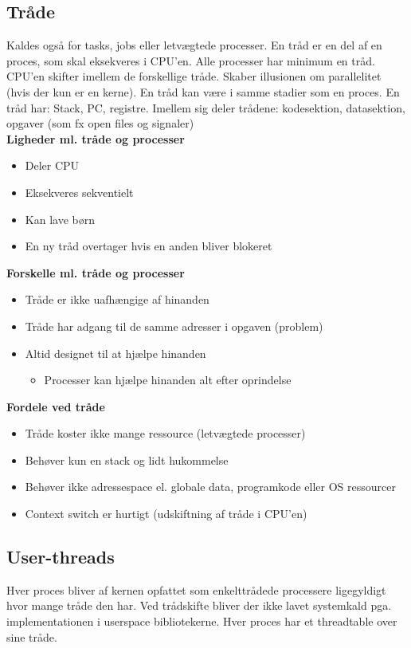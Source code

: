 \subsection{Tråde}
Kaldes også for tasks, jobs eller letvægtede processer. En tråd er en del af en proces, som skal eksekveres i CPU’en. Alle processer har minimum en tråd. CPU’en skifter imellem de forskellige tråde. Skaber illusionen om parallelitet (hvis der kun er en kerne).  En tråd kan være i samme stadier som en proces. En tråd har:
Stack, PC, registre. Imellem sig deler trådene: kodesektion, datasektion, opgaver (som fx open files og signaler)\\

\textbf{Ligheder ml. tråde og processer}

\begin{itemize}
	\item Deler CPU
	\item Eksekveres sekventielt
	\item Kan lave børn
	\item En ny tråd overtager hvis en anden bliver blokeret
\end{itemize}

\textbf{Forskelle ml. tråde og processer}
\begin{itemize}
	\item Tråde er ikke uafhængige af hinanden
	\item Tråde har adgang til de samme adresser i opgaven (problem)
	\item Altid designet til at hjælpe hinanden
	\begin{itemize}
		\item Processer kan hjælpe hinanden alt efter oprindelse
	\end{itemize}
\end{itemize}

\textbf{Fordele ved tråde}
\begin{itemize}
	\item Tråde koster ikke mange ressource (letvægtede processer)
	\item Behøver kun en stack og lidt hukommelse
	\item Behøver ikke adressespace el. globale data, programkode eller OS ressourcer
	\item Context switch er hurtigt (udskiftning af tråde i CPU'en)
\end{itemize}

\subsection{User-threads}
Hver proces bliver af kernen opfattet som enkelttrådede processere ligegyldigt hvor mange tråde den har. Ved trådskifte bliver der ikke lavet systemkald pga. implementationen i userspace bibliotekerne. Hver proces har et threadtable over sine tråde.\\


